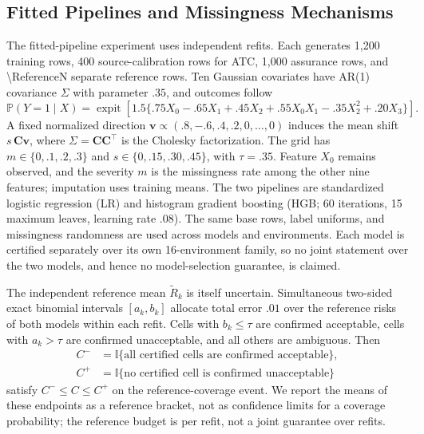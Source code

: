 \documentclass[twoside,11pt]{article}
\newcommand{\Pp}{\mathbb P}
\begin{document}
\subsection{Fitted Pipelines and Missingness Mechanisms}
\label{sec:nested}
\label{sec:missing}
The fitted-pipeline experiment uses \NestedReps{} independent refits. Each generates 1,200
training rows, 400 source-calibration rows for ATC, 1,000 assurance rows, and
\num{\ReferenceN} separate reference rows. Ten Gaussian covariates have AR(1) covariance
$\Sigma$ with parameter $.35$, and outcomes follow
\begin{equation}
\Pp(Y=1\mid X)=\operatorname{expit}\left[1.5\{.75X_0-.65X_1+.45X_2
+ .55X_0X_1-.35X_2^2+.20X_3\}\right].
\label{eq:dgp}
\end{equation}
A fixed normalized direction $\mathbf v\propto(.8,-.6,.4,.2,0,\ldots,0)$ induces the mean
shift $s\,\mathbf C\mathbf v$, where $\Sigma=\mathbf C\mathbf C^\top$ is the Cholesky
factorization. The grid has $m\in\{0,.1,.2,.3\}$ and $s\in\{0,.15,.30,.45\}$, with $\tau=.35$.
Feature $X_0$ remains observed, and the severity $m$ is the missingness rate among the other
nine features; imputation uses training means. The two pipelines are standardized logistic
regression (LR) and histogram gradient boosting (HGB; 60 iterations, 15 maximum leaves,
learning rate $.08$). The same base rows, label uniforms, and missingness randomness are used
across models and environments. Each model is certified separately over its own
16-environment family, so no joint statement over the two models, and hence no
model-selection guarantee, is claimed.

The independent reference mean $\widetilde R_k$ is itself uncertain. Simultaneous two-sided
exact binomial intervals $[a_k,b_k]$ allocate total error $.01$ over the reference risks of
both models within each refit. Cells with $b_k\leq\tau$ are confirmed acceptable, cells with
$a_k>\tau$ are confirmed unacceptable, and all others are ambiguous. Then
\begin{equation}
\begin{aligned}
C^- &=\mathbb I\{\text{all certified cells are confirmed acceptable}\},\\
C^+ &=\mathbb I\{\text{no certified cell is confirmed unacceptable}\}
\end{aligned}
\label{eq:reference}
\end{equation}
satisfy $C^-\leq C\leq C^+$ on the reference-coverage event. We report the means of these
endpoints as a reference bracket, not as confidence limits for a coverage probability; the
reference budget is per refit, not a joint guarantee over refits.
\end{document}
